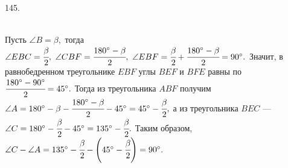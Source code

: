 145. \begin{figure}[ht!]
\end{figure}\\
Пусть $\angle B=\beta,$ тогда $\angle EBC=\cfrac{\beta}{2},\ \angle CBF=\cfrac{180^\circ-\beta}{2},\ \angle EBF=\cfrac{\beta}{2}+\cfrac{180^\circ-\beta}{2}=90^\circ.$ Значит, в равнобедренном треугольнике $EBF$ углы $BEF$ и $BFE$ равны по $\cfrac{180^\circ-90^\circ}{2}=45^\circ.$ Тогда из треугольника $ABF$ получим $\angle A=180^\circ-\beta-\cfrac{180^\circ-\beta}{2}-45^\circ=45^\circ-\cfrac{\beta}{2},$ а из треугольника $BEC$ --- $\angle C=180^\circ-\cfrac{\beta}{2}-45^\circ=135^\circ-\cfrac{\beta}{2}.$ Таким образом, $\angle C-\angle A=135^\circ-\cfrac{\beta}{2} -\left(45^\circ-\cfrac{\beta}{2}\right)=90^\circ.$\newpage\noindent
